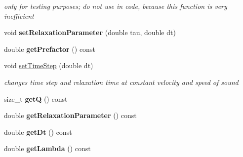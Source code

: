 \begin{DoxyCompactItemize}
\begin{DoxyCompactList}\small\item\em only for testing purposes; do not use in code, because this function is very inefficient \item\end{DoxyCompactList}\item 
\hypertarget{classnatrium_1_1BGK_acf54bde642d2dc1f83d700fc0a73d575}{
void {\bfseries setRelaxationParameter} (double tau, double dt)}
\label{classnatrium_1_1BGK_acf54bde642d2dc1f83d700fc0a73d575}

\item 
\hypertarget{classnatrium_1_1BGK_a67554c50c9f32d3b51f075988b809b4d}{
double {\bfseries getPrefactor} () const }
\label{classnatrium_1_1BGK_a67554c50c9f32d3b51f075988b809b4d}

\item 
\hypertarget{classnatrium_1_1BGK_a0bbb2526cbfc13c361333a9c32beb0a0}{
void \hyperlink{classnatrium_1_1BGK_a0bbb2526cbfc13c361333a9c32beb0a0}{setTimeStep} (double dt)}
\label{classnatrium_1_1BGK_a0bbb2526cbfc13c361333a9c32beb0a0}

\begin{DoxyCompactList}\small\item\em changes time step and relaxation time at constant velocity and speed of sound \item\end{DoxyCompactList}\item 
\hypertarget{classnatrium_1_1BGK_ab3069be02b1836b1e55c76054c4433a8}{
size\_\-t {\bfseries getQ} () const }
\label{classnatrium_1_1BGK_ab3069be02b1836b1e55c76054c4433a8}

\item 
\hypertarget{classnatrium_1_1BGK_adac002cf79a455f6b053b51210f39acb}{
double {\bfseries getRelaxationParameter} () const }
\label{classnatrium_1_1BGK_adac002cf79a455f6b053b51210f39acb}

\item 
\hypertarget{classnatrium_1_1BGK_a0e0ead95ae973c7d1c561edf35b3cba3}{
double {\bfseries getDt} () const }
\label{classnatrium_1_1BGK_a0e0ead95ae973c7d1c561edf35b3cba3}

\item 
\hypertarget{classnatrium_1_1BGK_af6b4c1726c7454c516a044d00f0917f4}{
double {\bfseries getLambda} () const }
\label{classnatrium_1_1BGK_af6b4c1726c7454c516a044d00f0917f4}

\end{DoxyCompactItemize}
